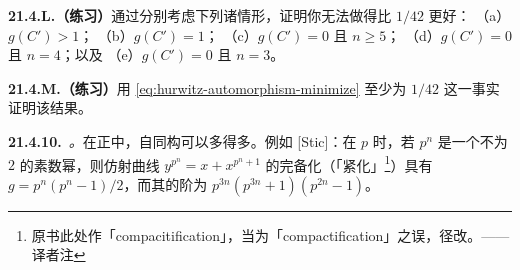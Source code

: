 \textbf{21.4.L.（练习）}\quad 通过分别考虑下列诸情形，证明你无法做得比 $1/42$ 更好：
（a）$g(C')>1$；
（b）$g(C')=1$；
（c）$g(C')=0$ 且 $n\ge 5$；
（d）$g(C')=0$ 且 $n=4$；以及
（e）$g(C')=0$ 且 $n=3$。

\textbf{21.4.M.（练习）}\quad 用 \eqref{eq:hurwitz-automorphism-minimize} 至少为 $1/42$ 这一事实证明该结果。

\textbf{21.4.10.}\ \emph{\trhRemark{}。}\quad 在正\trCharacteristic{}中，自同构可以多得多。例如 [Stic]：在\trCharacteristic{} $p$ 时，若 $p^n$ 是一个不为 $2$ 的素数幂，则仿射曲线 $y^{p^n}=x+x^{p^n+1}$ 的完备化（「紧化」\footnote{原书此处作「compacitification」，当为「compactification」之误，径改。——译者注}）具有\trGenus{} $g=p^n(p^n-1)/2$，而其\trAutomorphismGroup{}的阶为 $p^{3n}(p^{3n}+1)(p^{2n}-1)$。

